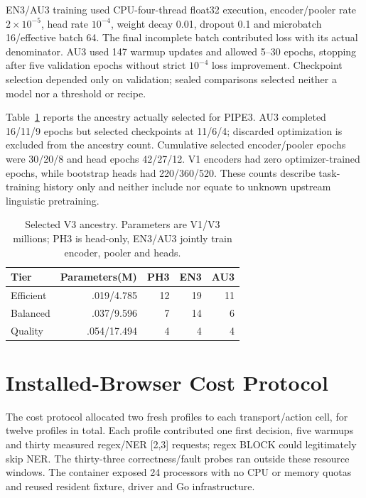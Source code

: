 \documentclass[conference]{IEEEtran}
\begin{document}
EN3/AU3 training used CPU-four-thread float32 execution, encoder/pooler rate $2\times10^{-5}$, head rate $10^{-4}$, weight decay 0.01, dropout 0.1 and microbatch 16/effective batch 64. The final incomplete batch contributed loss with its actual denominator. AU3 used 147 warmup updates and allowed 5--30 epochs, stopping after five validation epochs without strict $10^{-4}$ loss improvement. Checkpoint selection depended only on validation; sealed comparisons selected neither a model nor a threshold or recipe.

Table~\ref{tab:lineage} reports the ancestry actually selected for PIPE3. AU3 completed 16/11/9 epochs but selected checkpoints at 11/6/4; discarded optimization is excluded from the ancestry count. Cumulative selected encoder/pooler epochs were 30/20/8 and head epochs 42/27/12. V1 encoders had zero optimizer-trained epochs, while bootstrap heads had 220/360/520. These counts describe task-training history only and neither include nor equate to unknown upstream linguistic pretraining.

\begin{table}[H]
\centering
\caption{Selected V3 ancestry. Parameters are V1/V3 millions; PH3 is head-only, EN3/AU3 jointly train encoder, pooler and heads.}
\label{tab:lineage}
\small
\begin{tabular}{lrrrr}
\toprule
Tier & Parameters(M) & PH3 & EN3 & AU3 \\
\midrule
Efficient &.019/4.785 &12 &19 &11 \\
Balanced &.037/9.596 &7 &14 &6 \\
Quality &.054/17.494 &4 &4 &4 \\
\bottomrule
\end{tabular}
\end{table}



\section{Installed-Browser Cost Protocol}
\label{app:browser_protocol}
The cost protocol allocated two fresh profiles to each transport/action cell, for twelve profiles in total. Each profile contributed one first decision, five warmups and thirty measured regex/NER [2,3] requests; regex BLOCK could legitimately skip NER. The thirty-three correctness/fault probes ran outside these resource windows. The container exposed 24 processors with no CPU or memory quotas and reused resident fixture, driver and Go infrastructure.
\end{document}
